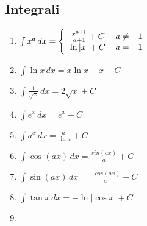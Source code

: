\subsection{Integrali}
\begin{center}
    \begin{small}
        \begin{enumerate}
            \item \begin{math}
                \int x^a\,dx =
                \Bigg\{\begin{tabular}{ccc}
                    $\frac{x^{a+1}}{a+1} + C$  & $a \neq -1$ & \\
                    $ \ln{\left|x\right|} + C$ & $a = -1$ & \\
                  \end{tabular}
            \end{math}
            \item \begin{math}
                \int \ln {x}\,dx = x \ln {x} - x + C
            \end{math}
            \item \begin{math}
                \int \frac {1}{\sqrt{x}}\,dx=2\sqrt{x} + C 
            \end{math}
            \item \begin{math}
                \int e^x\,dx = e^x + C
            \end{math}
            \item \begin{math}
                \int a^x\,dx = \frac{a^x}{\ln{a}} + C
            \end{math}
            \item \begin{math}
                \int \cos({ax}) \, dx = { \frac{sin (ax)}{a} } + C
            \end{math}
            \item \begin{math}
                \int \sin({ax}) \, dx = { \frac{-cos(ax)}{a} } + C
            \end{math}
            \item \begin{math}
                \int \tan{x} \, dx = -\ln{\left| \cos {x} \right|} + C
            \end{math}
            \item \begin{math}

\end{math}
\end{enumerate}
\end{small}
\end{center}
